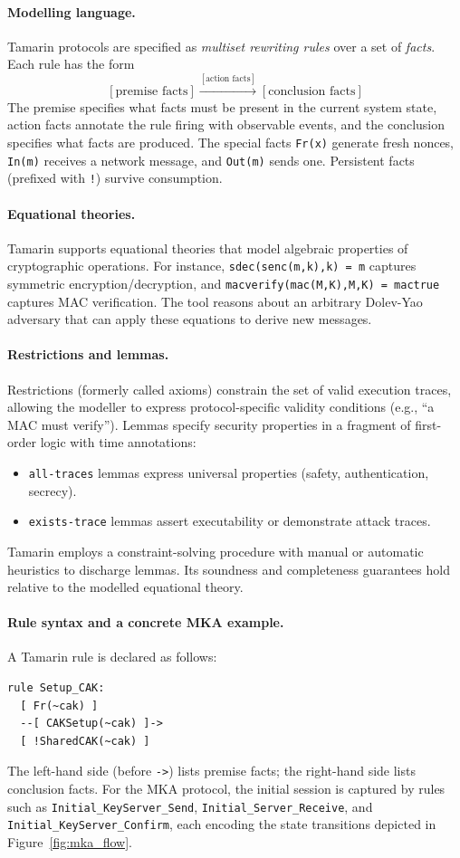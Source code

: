 \paragraph{Modelling language.} Tamarin protocols are specified as \emph{multiset rewriting rules} over a set of \emph{facts}. Each rule has the form
\[
  [\text{premise facts}] \xrightarrow{[\text{action facts}]} [\text{conclusion facts}]
\]
The premise specifies what facts must be present in the current system state, action facts annotate the rule firing with observable events, and the conclusion specifies what facts are produced. The special facts \texttt{Fr(x)} generate fresh nonces, \texttt{In(m)} receives a network message, and \texttt{Out(m)} sends one. Persistent facts (prefixed with \texttt{!}) survive consumption.

\paragraph{Equational theories.} Tamarin supports equational theories that model algebraic properties of cryptographic operations. For instance, \texttt{sdec(senc(m,k),k) = m} captures symmetric encryption/decryption, and \texttt{macverify(mac(M,K),M,K) = mactrue} captures MAC verification. The tool reasons about an arbitrary Dolev-Yao adversary that can apply these equations to derive new messages.

\paragraph{Restrictions and lemmas.} Restrictions (formerly called axioms) constrain the set of valid execution traces, allowing the modeller to express protocol-specific validity conditions (e.g., ``a MAC must verify''). Lemmas specify security properties in a fragment of first-order logic with time annotations:
\begin{itemize}
  \item \texttt{all-traces} lemmas express universal properties (safety, authentication, secrecy).
  \item \texttt{exists-trace} lemmas assert executability or demonstrate attack traces.
\end{itemize}
Tamarin employs a constraint-solving procedure with manual or automatic heuristics to discharge lemmas. Its soundness and completeness guarantees hold relative to the modelled equational theory.

\paragraph{Rule syntax and a concrete MKA example.} A Tamarin rule is declared as follows:
\begin{verbatim}
rule Setup_CAK:
  [ Fr(~cak) ]
  --[ CAKSetup(~cak) ]->
  [ !SharedCAK(~cak) ]
\end{verbatim}
The left-hand side (before \texttt{->}) lists premise facts; the right-hand side lists conclusion facts. For the MKA protocol, the initial session is captured by rules such as \texttt{Initial\_KeyServer\_Send}, \texttt{Initial\_Server\_Receive}, and \texttt{Initial\_KeyServer\_Confirm}, each encoding the state transitions depicted in Figure~\ref{fig:mka_flow}.

